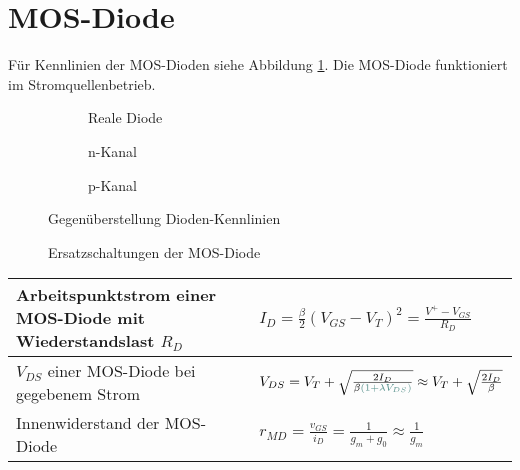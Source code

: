 \section{MOS-Diode}
Für Kennlinien der MOS-Dioden siehe Abbildung \ref{fig:diodenKennlinien}. Die MOS-Diode funktioniert im Stromquellenbetrieb.
\begin{figure}[h]
	\centering
	\begin{subfigure}[b]{2cm}
		\centering
		\caption{Reale Diode}
	\end{subfigure} \quad
	\begin{subfigure}[b]{3cm}
			\centering
	\end{subfigure} \quad
	\begin{subfigure}[b]{3cm}
		\centering
		\caption{n-Kanal}
	\end{subfigure}
	\begin{subfigure}[b]{3cm}
		\centering
		\caption{p-Kanal}
	\end{subfigure}
	\begin{subfigure}[b]{3cm}
		\centering
	\end{subfigure}	
	\hspace{1.5cm}
			
	\caption{Gegenüberstellung Dioden-Kennlinien}
	\label{fig:diodenKennlinien}
\end{figure}

\begin{figure}[h]
	\centering
	\begin{subfigure}[b]{5cm}
		\centering
	\end{subfigure} \qquad\qquad
	\begin{subfigure}[b]{3cm}
		\centering
	\end{subfigure} \qquad\qquad
	\begin{subfigure}[b]{2cm}
		\centering
	\end{subfigure}
	\caption{Ersatzschaltungen der MOS-Diode}
\end{figure}

\begin{tabular}{|l|l|}
	\hline
	Arbeitspunktstrom einer MOS-Diode mit Wiederstandslast $R_D$
	& $I_D = \frac{\beta}{2} (V_{GS} -V_T)^2 = \frac{V^+ - V_{GS}}{R_D} $
	\\ \hline
	$V_{DS}$ einer MOS-Diode bei gegebenem Strom
	& $ V_{DS} = V_T + \sqrt{\frac{2I_D}{\beta \textcolor{HSRLakeGreen}{(1+\lambda V_{DS})}}} \approx V_T + \sqrt{\frac{2I_D}{\beta}} $
	\\ \hline
	Innenwiderstand der MOS-Diode
	& $ r_{MD} = \frac{v_{GS}}{i_D} = \frac{1}{g_m + g_0} \approx \frac{1}{g_m} $
	\\ \hline	
\end{tabular}

